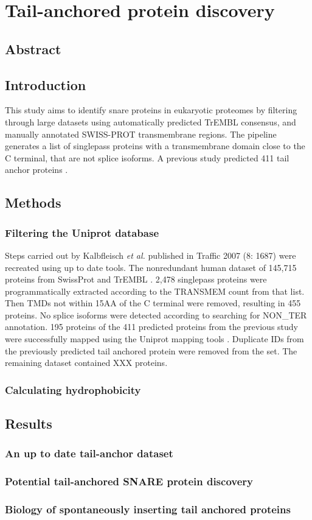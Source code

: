 \chapter{Tail-anchored protein discovery} %
\section{Abstract}

\section{Introduction}
This study aims to identify \gls{snare} proteins in eukaryotic proteomes by filtering through large datasets using automatically predicted TrEMBL consensus, and manually annotated SWISS-PROT transmembrane regions. The pipeline generates a list of singlepass proteins with a transmembrane domain close to the C terminal, that are not splice isoforms. A previous study predicted 411 tail anchor proteins \cite{Kalbfleisch2007}.

\section{Methods}

\subsection{Filtering the Uniprot database}
Steps carried out by Kalbfleisch {\it et al.} published in Traffic 2007 (8: 1687) were recreated using up to date tools. The non\-redundant human dataset of 145,715 proteins from SwissProt and TrEMBL \cite{Kalbfleisch2007, TheUniProtConsortium2014}. 2,478 singlepass proteins were programmatically extracted according to the TRANSMEM count from that list. Then TMDs not within 15AA of the C terminal were removed, resulting in 455 proteins. No splice isoforms were detected according to searching for NON\_TER annotation. 195 proteins of the 411 predicted proteins from the previous study were successfully mapped using the Uniprot mapping tools \cite{Kalbfleisch2007, TheUniProtConsortium2014}. Duplicate IDs from the previously predicted tail anchored protein were removed from the set. The remaining dataset contained XXX proteins.

\subsection{Calculating hydrophobicity}

\section{Results}

\subsection{An up to date tail-anchor dataset}

\subsection{Potential tail-anchored SNARE protein discovery}

\subsection{Biology of spontaneously inserting tail anchored proteins}
